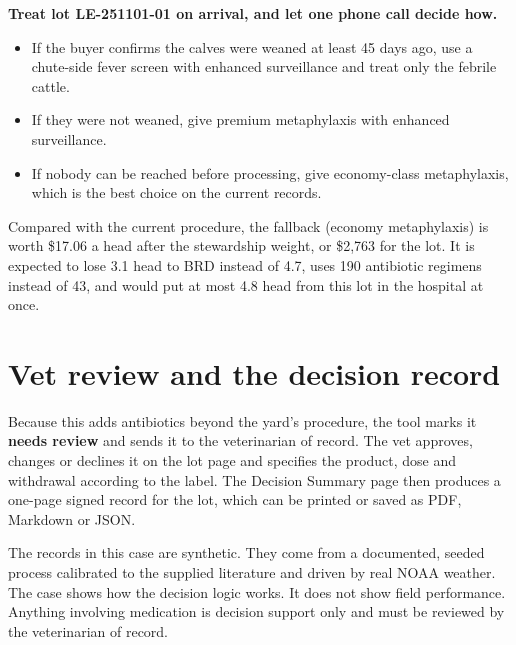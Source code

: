 \documentclass[10pt,letterpaper]{article}
\newcommand{\usd}[1]{\$#1}
\begin{document}
\begin{tcolorbox}[colback=boxbg,colframe=accent,boxrule=0.6pt,arc=2pt,left=6pt,right=6pt,top=4pt,bottom=4pt]
\textbf{Treat lot LE-251101-01 on arrival, and let one phone call decide how.}
\begin{itemize}
  \item If the buyer confirms the calves were weaned at least 45 days ago, use a chute-side fever screen with enhanced surveillance and treat only the febrile cattle.
  \item If they were not weaned, give premium metaphylaxis with enhanced surveillance.
  \item If nobody can be reached before processing, give economy-class metaphylaxis, which is the best choice on the current records.
\end{itemize}
\end{tcolorbox}

Compared with the current procedure, the fallback (economy metaphylaxis) is worth \usd{17.06} a head after the stewardship weight, or \usd{2,763} for the lot. It is expected to lose 3.1 head to BRD instead of 4.7, uses 190 antibiotic regimens instead of 43, and would put at most 4.8 head from this lot in the hospital at once.

\section{Vet review and the decision record}

Because this adds antibiotics beyond the yard's procedure, the tool marks it \textbf{needs review} and sends it to the veterinarian of record. The vet approves, changes or declines it on the lot page and specifies the product, dose and withdrawal according to the label. The Decision Summary page then produces a one-page signed record for the lot, which can be printed or saved as PDF, Markdown or JSON.

\vfill
{\footnotesize\color{gray} The records in this case are synthetic. They come from a documented, seeded process calibrated to the supplied literature and driven by real NOAA weather. The case shows how the decision logic works. It does not show field performance. Anything involving medication is decision support only and must be reviewed by the veterinarian of record.}
\end{document}
